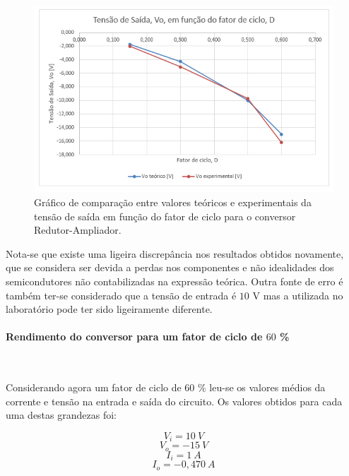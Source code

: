 \documentclass[a4paper,11pt]{article}
\numberwithin{equation}{section}
\begin{document}
\begin{figure}[H]
	\centering
	\includegraphics[keepaspectratio=true, scale=1.0]{teoricas/graf_buck_boost}
	\caption{Gráfico de comparação entre valores teóricos e experimentais da tensão de saída em função do fator de ciclo para o conversor Redutor-Ampliador.}
	\label{fig:graf_buck_boost}
	\vspace{-0.8em}
\end{figure}

Nota-se que existe uma ligeira discrepância nos resultados obtidos novamente, que se considera ser devida a perdas nos componentes e não idealidades dos semicondutores não contabilizadas na expressão teórica. Outra fonte de erro é também ter-se considerado que a tensão de entrada é $10$ V mas a utilizada no laboratório pode ter sido ligeiramente diferente.

\paragraph{Rendimento do conversor para um fator de ciclo de $60$ \%}\mbox{}\

Considerando agora um fator de ciclo de $60$ \% leu-se os valores médios da corrente e tensão na entrada e saída do circuito. Os valores obtidos para cada uma destas grandezas foi:

\begin{equation}
V_i = 10 ~ V
\end{equation} 
\vspace{-0,8 cm}
\begin{equation}
V_o = -15 ~ V
\end{equation} 
\vspace{-0,8 cm}
\begin{equation}
I_i = 1 ~ A
\end{equation} 
\vspace{-0,8 cm}
\begin{equation}
I_o =-0,470 ~ A
\end{equation} 
\end{document}
